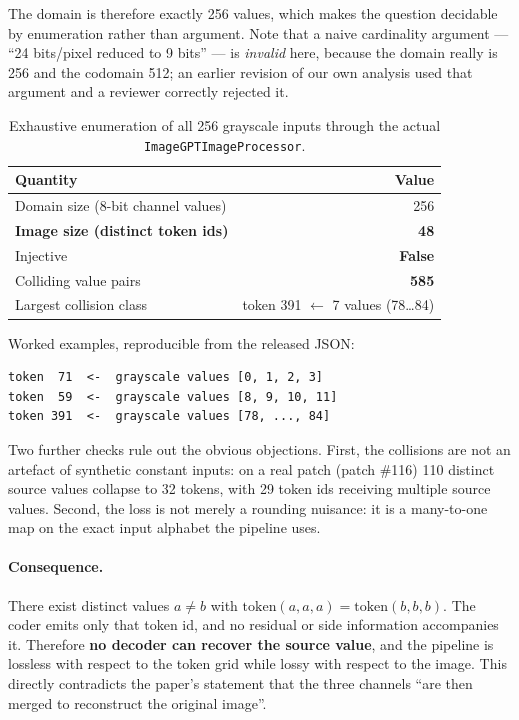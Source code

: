 \documentclass[11pt,a4paper]{article}
\newcommand{\code}[1]{\texttt{\small #1}}
\begin{document}
The domain is therefore exactly 256 values, which makes the question decidable by
enumeration rather than argument. Note that a naive cardinality argument ---
``24 bits/pixel reduced to 9 bits'' --- is \emph{invalid} here, because the domain
really is 256 and the codomain 512; an earlier revision of our own analysis used
that argument and a reviewer correctly rejected it.

\begin{table}[htbp]
\centering
\small
\caption{Exhaustive enumeration of all 256 grayscale inputs through the actual
\code{ImageGPTImageProcessor}.}
\label{tab:injectivity}
\begin{tabular}{lr}
\toprule
Quantity & Value \\
\midrule
Domain size (8-bit channel values) & 256 \\
\textbf{Image size (distinct token ids)} & \textbf{48} \\
Injective & \textbf{False} \\
Colliding value pairs & \textbf{585} \\
Largest collision class & token 391 $\leftarrow$ 7 values (78\dots84) \\
\bottomrule
\end{tabular}
\end{table}

Worked examples, reproducible from the released JSON:

\begin{lstlisting}[numbers=none]
token  71  <-  grayscale values [0, 1, 2, 3]
token  59  <-  grayscale values [8, 9, 10, 11]
token 391  <-  grayscale values [78, ..., 84]
\end{lstlisting}

Two further checks rule out the obvious objections. First, the collisions are not
an artefact of synthetic constant inputs: on a real patch (patch \#116) 110
distinct source values collapse to 32 tokens, with 29 token ids receiving multiple
source values. Second, the loss is not merely a rounding nuisance: it is a
many-to-one map on the exact input alphabet the pipeline uses.

\paragraph{Consequence.} There exist distinct values $a \neq b$ with
$\mathrm{token}(a,a,a) = \mathrm{token}(b,b,b)$. The coder emits only that token
id, and no residual or side information accompanies it. Therefore \textbf{no
decoder can recover the source value}, and the pipeline is lossless with respect
to the token grid while lossy with respect to the image. This directly contradicts
the paper's statement that the three channels ``are then merged to reconstruct
the original image''.
\end{document}
